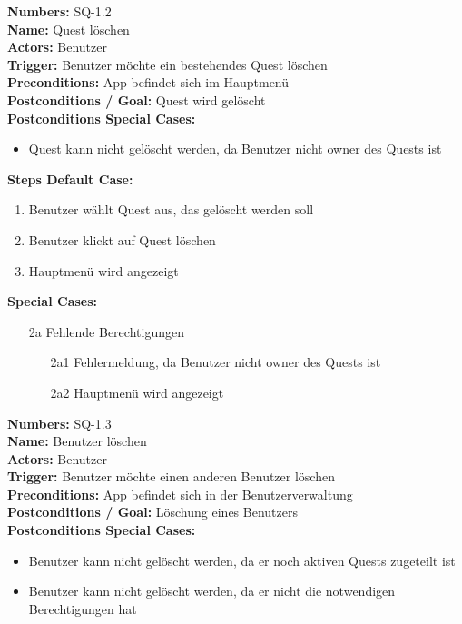 \documentclass{article}
\begin{document}
    \textbf{Numbers:} SQ-1.2\\
    \textbf{Name:} Quest löschen\\
    \textbf{Actors:} Benutzer\\
    \textbf{Trigger:} Benutzer möchte ein bestehendes Quest löschen\\
    \textbf{Preconditions:}  App befindet sich im Hauptmenü\\
    \textbf{Postconditions / Goal:} Quest wird gelöscht \\
    \textbf{Postconditions Special Cases:} 
    \begin{itemize}
        \item Quest kann nicht gelöscht werden, da Benutzer nicht owner des Quests ist 
    \end{itemize}
    \textbf{Steps Default Case:} 
    \begin{enumerate}
        \item Benutzer wählt Quest aus, das gelöscht werden soll
        \item Benutzer klickt auf Quest löschen
        \item Hauptmenü wird angezeigt
    \end{enumerate}
    \textbf{Special Cases:}
    \begin{itemize}
        \item [2a] Fehlende Berechtigungen 
        \begin{itemize}
            \item [2a1] Fehlermeldung, da Benutzer nicht owner des Quests ist
            \item [2a2] Hauptmenü wird angezeigt
        \end{itemize}
    \end{itemize}
    \textbf{Numbers:} SQ-1.3\\
    \textbf{Name:} Benutzer löschen\\
    \textbf{Actors:} Benutzer\\
    \textbf{Trigger:} Benutzer möchte einen anderen Benutzer löschen\\
    \textbf{Preconditions:}  App befindet sich in der Benutzerverwaltung\\
    \textbf{Postconditions / Goal:} Löschung eines Benutzers\\
    \textbf{Postconditions Special Cases:}
    \begin{itemize}
        \item Benutzer kann nicht gelöscht werden, da er noch aktiven Quests zugeteilt ist
        \item Benutzer kann nicht gelöscht werden, da er nicht die notwendigen Berechtigungen hat
    \end{itemize}
\end{document}
